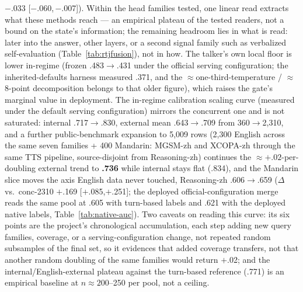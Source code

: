$-$.033 [$-$.060,\,$-$.007]). Within the head families tested, one
linear read extracts what these methods reach --- an empirical
plateau of the tested readers, not a bound on the state's
information; the remaining headroom lies in what is read: later into
the answer, other layers, or a second signal family such as
verbalized self-evaluation (Table~\ref{tab:rtjfusion}), not in how. The
talker's own local floor is lower
in-regime (frozen .483$\to$.431 under the official serving
configuration; the inherited-defaults harness measured .371, and the
$\approx$one-third-temperature / $\approx$8-point decomposition
belongs to that older figure), which
raises the gate's marginal value in deployment. The in-regime
calibration scaling curve (measured under the default serving
configuration) mirrors the concurrent one and is not
saturated: internal .717$\to$.830, external mean .643$\to$.709 from
360$\to$2{,}310, and a further public-benchmark expansion to 5{,}009
rows (2{,}300 English across the same seven families + 400 Mandarin:
MGSM-zh and XCOPA-zh through the same TTS pipeline, source-disjoint
from Reasoning-zh) continues the $\approx{+}.02$-per-doubling external
trend to \textbf{.736} while internal stays flat (.834), and the
Mandarin slice moves the axis English data never touched, Reasoning-zh
.606$\to$.659 ($\Delta$ vs.\ conc-2310 $+$.169 [$+$.085,$+$.251]; the
deployed official-configuration merge reads the same pool at .605
with turn-based labels and .621 with the deployed native labels,
Table~\ref{tab:native-auc}). Two caveats on reading this curve: its
six points are the project's chronological accumulation, each step
adding new query families, coverage, or a serving-configuration
change, not repeated random subsamples of the final set, so it
evidences that added coverage transfers, not that another
random doubling of the same families would return $+$.02; and the
internal/English-external plateau against the turn-based reference
(.771) is an empirical baseline at $n{\approx}200$--250 per pool,
not a ceiling.

